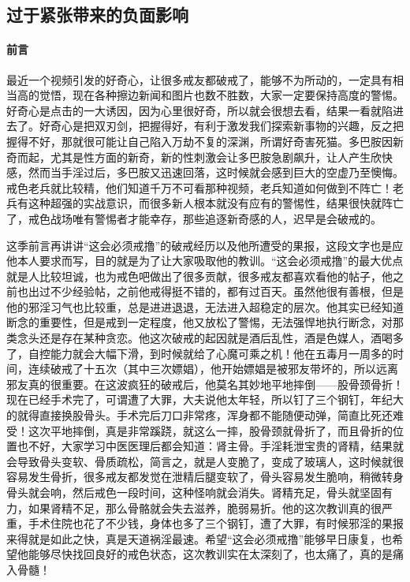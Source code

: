 \subsection{过于紧张带来的负面影响}

\paragraph*{前言}

最近一个视频引发的好奇心，让很多戒友都破戒了，能够不为所动的，一定具有相当高的觉悟，现在各种擦边新闻和图片也数不胜数，大家一定要保持高度的警惕。好奇心是点击的一大诱因，因为心里很好奇，所以就会很想去看，结果一看就陷进去了。好奇心是把双刃剑，把握得好，有利于激发我们探索新事物的兴趣，反之把握得不好，那就很可能让自己陷入万劫不复的深渊，所谓好奇害死猫。多巴胺因新奇而起，尤其是性方面的新奇，新的性刺激会让多巴胺急剧飙升，让人产生欣快感，然而当手淫过后，多巴胺又迅速回落，这时候就会感到巨大的空虚乃至懊悔。戒色老兵就比较精，他们知道千万不可看那种视频，老兵知道如何做到不阵亡！老兵有这种超强的实战意识，而很多新人根本就没有应有的警惕性，结果很快就阵亡了，戒色战场唯有警惕者才能幸存，那些追逐新奇感的人，迟早是会破戒的。

这季前言再讲讲“这会必须戒撸”的破戒经历以及他所遭受的果报，这段文字也是应他本人要求而写，目的就是为了让大家吸取他的教训。“这会必须戒撸”的最大优点就是人比较坦诚，也为戒色吧做出了很多贡献，很多戒友都喜欢看他的帖子，他之前也出过不少经验帖，之前他戒得挺不错的，都有过百天。虽然他很有善根，但是他的邪淫习气也比较重，总是进进退退，无法进入超稳定的层次。他其实已经知道断念的重要性，但是戒到一定程度，他又放松了警惕，无法强悍地执行断念，对那类念头还是存在某种贪恋。他这次破戒的起因就是酒后乱性，酒是色媒人，酒喝多了，自控能力就会大幅下滑，到时候就给了心魔可乘之机！他在五毒月一周多的时间，连续破戒了十五次（其中三次嫖娼），他开始嫖娼是被邪友带坏的，所以远离邪友真的很重要。在这波疯狂的破戒后，他莫名其妙地平地摔倒——股骨颈骨折！现在已经手术完了，可谓遭了大罪，大夫说他太年轻，所以钉了三个钢钉，年纪大的就得直接换股骨头。手术完后刀口非常疼，浑身都不能随便动弹，简直比死还难受！这次平地摔倒，真是非常蹊跷，就这么一摔，股骨颈就骨折了，而且骨折的位置也不好，大家学习中医医理后都会知道：肾主骨。手淫耗泄宝贵的肾精，结果就会导致骨头变软、骨质疏松，简言之，就是人变脆了，变成了玻璃人，这时候就很容易发生骨折，很多戒友都发觉在泄精后腿变软了，骨头容易发生脆响，稍微转身骨头就会响，然后戒色一段时间，这种怪响就会消失。肾精充足，骨头就坚固有力，如果肾精不足，那么骨骼就会失去滋养，脆弱易折。他的这次教训真的很严重，手术住院也花了不少钱，身体也多了三个钢钉，遭了大罪，有时候邪淫的果报来得就是如此之快，真是天道祸淫最速。希望“这会必须戒撸”能够早日康复，也希望他能够尽快找回良好的戒色状态，这次教训实在太深刻了，也太痛了，真的是痛入骨髓！

